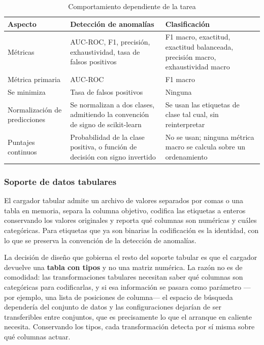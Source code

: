 \documentclass[12pt,letterpaper,oneside]{article}
\begin{document}
\begin{table}[H]
\centering
\small
\caption{Comportamiento dependiente de la tarea}
\label{tab:tareas}
\begin{tabularx}{\textwidth}{>{}L>{}L>{}L}
\toprule
\textbf{Aspecto} & \textbf{Detección de anomalías} & \textbf{Clasificación} \\
\midrule
Métricas &
AUC-ROC, F1, precisión, exhaustividad, tasa de falsos positivos &
F1 macro, exactitud, exactitud balanceada, precisión macro, exhaustividad macro \\
Métrica primaria & AUC-ROC & F1 macro \\
Se minimiza & Tasa de falsos positivos & Ninguna \\
Normalización de predicciones &
Se normalizan a dos clases, admitiendo la convención de signo de scikit-learn &
Se usan las etiquetas de clase tal cual, sin reinterpretar \\
Puntajes continuos &
Probabilidad de la clase positiva, o función de decisión con signo invertido &
No se usan; ninguna métrica macro se calcula sobre un ordenamiento \\
\bottomrule
\end{tabularx}
\end{table}

\subsubsection{Soporte de datos tabulares}

El cargador tabular admite un archivo de valores separados por comas o una tabla en memoria,
separa la columna objetivo, codifica las etiquetas a enteros conservando los valores
originales y reporta qué columnas son numéricas y cuáles categóricas. Para etiquetas que ya
son binarias la codificación es la identidad, con lo que se preserva la convención de la
detección de anomalías.

La decisión de diseño que gobierna el resto del soporte tabular es que el cargador devuelve
una \textbf{tabla con tipos} y no una matriz numérica. La razón no es de comodidad: las
transformaciones tabulares necesitan saber qué columnas son categóricas para codificarlas, y
si esa información se pasara como parámetro —por ejemplo, una lista de posiciones de
columna— el espacio de búsqueda dependería del conjunto de datos y las configuraciones
dejarían de ser transferibles entre conjuntos, que es precisamente lo que el arranque en
caliente necesita. Conservando los tipos, cada transformación detecta por sí misma sobre qué
columnas actuar.
\end{document}
